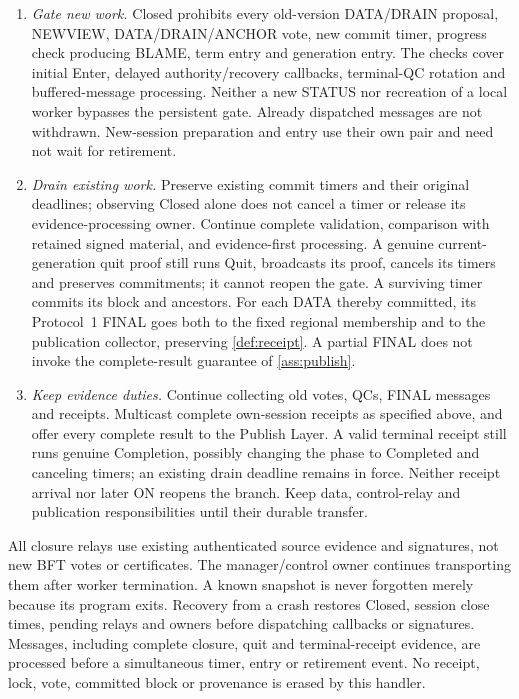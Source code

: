 \begin{enumerate}[label=(\roman*),itemsep=2pt]
duplicate, or returning a Terminated/tombstone result. Historical
context is validated without requiring that the old version remain
open. Complete proposals from correct voters carry or resolve this
context within the existing complete-message bound. This handler is
mandatory even if the old worker was never created, its ReadyBundle
is refused, or a delayed callback arrives after exit or restart.
\item \emph{Gate new work.} Closed prohibits every old-version
DATA/DRAIN proposal, NEWVIEW, DATA/DRAIN/ANCHOR vote, new commit timer,
progress check producing BLAME, term entry and generation entry.
The checks cover initial Enter, delayed authority/recovery callbacks,
terminal-QC rotation and buffered-message processing. Neither a new
STATUS nor recreation of a local worker bypasses the persistent gate.
Already dispatched messages are not withdrawn. New-session preparation
and entry use their own pair and need not wait for retirement.
\item \emph{Drain existing work.} Preserve existing commit timers and
their original deadlines; observing Closed alone does not cancel a
timer or release its evidence-processing owner. Continue complete
validation, comparison with retained signed material, and evidence-first
processing. A genuine current-generation quit proof still runs Quit,
broadcasts its proof, cancels its timers and preserves commitments;
it cannot reopen the gate. A surviving timer commits its block and
ancestors. For each DATA thereby committed, its Protocol~1 FINAL goes
both to the fixed regional membership and to the publication collector,
preserving \cref{def:receipt}. A partial FINAL does not invoke the
complete-result guarantee of \cref{ass:publish}.
\item \emph{Keep evidence duties.} Continue collecting old votes, QCs,
FINAL messages and receipts. Multicast complete own-session receipts
as specified above, and offer every complete result to the Publish
Layer. A valid terminal receipt still runs genuine Completion,
possibly changing the phase to Completed and canceling timers; an
existing drain deadline remains in force. Neither receipt arrival nor
later ON reopens the branch. Keep data, control-relay and publication
responsibilities until their durable transfer.
\end{enumerate}
All closure relays use existing authenticated source evidence and
signatures, not new BFT votes or certificates. The manager/control owner
continues transporting them after worker termination. A known snapshot
is never forgotten merely because its program exits. Recovery from a
crash restores Closed, session close times, pending relays and owners
before dispatching callbacks or signatures. Messages, including complete
closure, quit and terminal-receipt evidence, are processed before a
simultaneous timer, entry or retirement event. No receipt, lock, vote,
committed block or provenance is erased by this handler.

